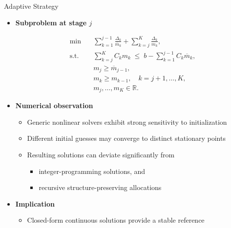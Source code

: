 \documentclass{beamer}
\begin{document}
\begin{frame}{Adaptive Strategy}

{\fontsize{10}{10}\selectfont
\begin{itemize}[leftmargin=5pt] 

\item \textcolor{myblue3}{\bf Subproblem at stage $j$}

\begin{align*}
    \min \quad
    & \sum_{k=1}^{j-1}\frac{\Delta_k}{\overline{m}_k}
    + \sum_{k=j}^{K}\frac{\Delta_k}{m_k}, \\[0.5em]
    \text{s.t.} \quad
    & \sum_{k=j}^{K} C_k m_k
    \;\le\;
    b - \sum_{k=1}^{j-1} C_k \overline{m}_k, \\[0.3em]
    & m_j \ge \overline{m}_{j-1}, \\
    & m_k \ge m_{k-1}, \quad k=j+1,\ldots,K, \\
    & m_j,\ldots,m_K \in \mathbb{R}.
\end{align*}

\vspace{2mm}

\item \textcolor{myred}{\bf Numerical observation}

\begin{itemize}[leftmargin=15pt] 
\item[$\circ$] Generic nonlinear solvers exhibit strong sensitivity to initialization
\item[$\circ$] Different initial guesses may converge to distinct stationary points
\item[$\circ$] Resulting solutions can deviate significantly from
\begin{itemize}
    \item[$\circ$] integer-programming solutions, and
    \item[$\circ$] recursive structure-preserving allocations
\end{itemize}
\end{itemize}

\vspace{1mm}

\item \textcolor{myblue3}{\bf Implication}
\begin{itemize}
\item[$\circ$] Closed-form continuous solutions provide a stable reference
\end{itemize}

\end{itemize}
}
\end{frame}
\end{document}

